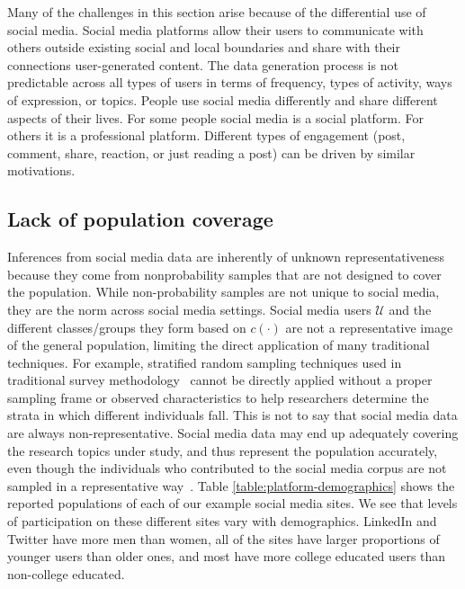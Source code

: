 \documentclass[11pt]{article} %
\begin{document}
Many of the challenges in this section arise because of the differential use of social media. Social media platforms allow their users to communicate with others outside existing social and local boundaries and share with their connections user-generated content. The data generation process is not predictable across all types of users in terms of frequency, types of activity, ways of expression, or topics. People use social media differently and share different aspects of their lives. For some people social media is a social platform. For others it is a professional platform. Different types of engagement (post, comment, share, reaction, or just reading a post) can be driven by similar motivations.  

\subsection{Lack of population coverage}

Inferences from social media data are inherently of unknown representativeness because they come from nonprobability samples that are not designed to cover the population. While non-probability samples are not unique to social media, they are the norm across social media settings. Social media users $\mathcal{U}$ and the different classes/groups they form based on $c(\cdot)$ are not a representative image of the general population, limiting the direct application of many traditional techniques. For example, stratified random sampling techniques used in traditional survey methodology~\cite{deleeuw2008} cannot be directly applied without a proper sampling frame or observed characteristics to help researchers determine the strata in which different individuals fall. This is not to say that social media data are always non-representative. Social media data may end up adequately covering the research topics under study, and thus represent the population accurately, even though the individuals who contributed to the social media corpus are not sampled in a representative way~\cite{schober2016}.
Table \ref{table:platform-demographics} shows the reported populations of each of our example social media sites.  We see that levels of participation on these different sites vary with demographics. LinkedIn and Twitter have more men than women, all of the sites have larger proportions of younger users than older ones, and most have more college educated users than non-college educated.  
\end{document}
